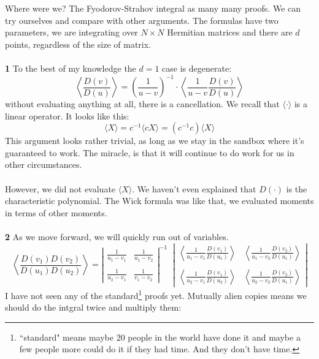 \documentclass[12pt]{article}
\begin{document}
\noindent Where were we? The Fyodorov-Strahov integral as many many proofs.  We can try ourselves and compare with other arguments.  The formulas have two parameters, we are integrating over $N \times N$ Hermitian matrices and there are $d$ points, regardless of the size of matrix.  \\ \\
\textbf{1} To the best of my knowledge the $d = 1$ case is degenerate:
$$ \left\langle \frac{D(v)}{D(u)} \right\rangle 
=  \left(\frac{1}{u-v} \right)^{-1} \cdot 
\left\langle \frac{1}{u-v} \frac{D(v)}{D(u)} \right\rangle $$
without evaluating anything at all, there is a cancellation.  We recall that $\langle \cdot \rangle$ is a linear operator.  It looks like this:
$$ \langle X \rangle = c^{-1} \langle cX \rangle  = (c^{-1}c) \langle X \rangle $$
This argument looks rather trivial, as long as we stay in the sandbox where it's guaranteed to work. The miracle, is that it will continue to do work for us in other circumstances. \\\\ However, we did not evaluate $\langle X\rangle$. We haven't even explained that $D(\cdot)$ is the characteristic polynomial. The Wick formula was like that, we evaluated moments in terms of other moments.  \\ \\
\textbf{2} As we move forward, we will quickly run out of variables.  
$$
\left\langle 
\frac{D(v_1)D(v_2)}{D(u_1) D(u_2)}
\right\rangle 
= \left| 
\begin{array}{cc}
\frac{1}{u_1 - v_1} & \frac{1}{u_1 - v_2} \\ \\
\frac{1}{u_2 - v_1} & \frac{1}{v_1 - v_2}  \end{array}\right|^{-1}  \;\;
\left| 
\begin{array}{cc}
\left\langle \frac{1}{u_1 - v_1} \frac{D(v_1)}{D(u_1)} \right \rangle & 
\left\langle \frac{1}{u_1 - v_2} \frac{D(v_2)}{D(u_1)} \right \rangle \\ \\
\left\langle \frac{1}{u_2 - v_1} \frac{D(v_1)}{D(u_2)} \right \rangle & 
\left\langle \frac{1}{u_2 - v_2} \frac{D(v_2)}{D(u_1)} \right \rangle  \end{array}\right|$$
I have not seen any of the standard\footnote{``standard" means maybe 20 people in the world have done it and maybe a few people more could do it if they had time.  And they don't have time.} proofs yet.
  Mutually alien copies means we should do the intgral twice and multiply them:
\end{document}
